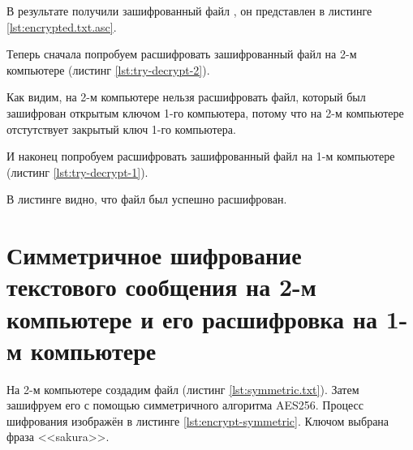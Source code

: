 



В результате получили зашифрованный файл , он представлен в листинге \ref{lst:encrypted.txt.asc}.



Теперь сначала попробуем расшифровать зашифрованный файл на 2-м компьютере (листинг \ref{lst:try-decrypt-2}).



Как видим, на 2-м компьютере нельзя расшифровать файл, который был зашифрован открытым ключом 1-го компьютера, потому что на 2-м компьютере отстутствует закрытый ключ 1-го компьютера.

И наконец попробуем расшифровать зашифрованный файл на 1-м компьютере (листинг \ref{lst:try-decrypt-1}).



В листинге видно, что файл был успешно расшифрован.

\section{Симметричное шифрование текстового сообщения на 2-м компьютере и его расшифровка на 1-м компьютере}

На 2-м компьютере создадим файл  (листинг \ref{lst:symmetric.txt}). Затем зашифруем его с помощью симметричного алгоритма AES256. Процесс шифрования изображён в листинге \ref{lst:encrypt-symmetric}. Ключом выбрана фраза <<sakura>>.



